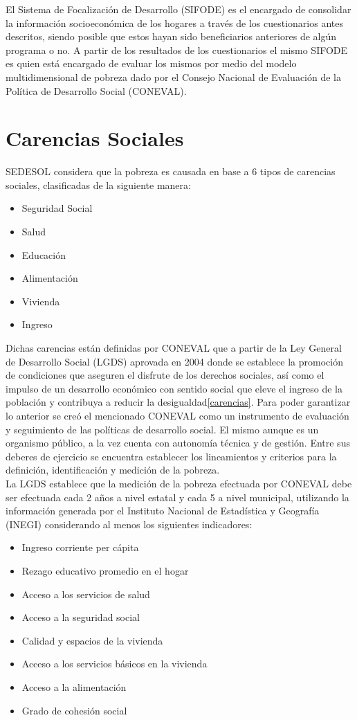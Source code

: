 El Sistema de Focalización de Desarrollo (SIFODE) es el encargado de consolidar la información socioeconómica de los hogares a través de los cuestionarios antes descritos, siendo posible que estos hayan sido beneficiarios anteriores de algún programa o no. A partir de los resultados de los cuestionarios el mismo SIFODE es quien está encargado de evaluar los mismos por medio del modelo multidimensional de pobreza dado por el Consejo Nacional de Evaluación de la Política de Desarrollo Social (CONEVAL)\cite{multidimensional}.\\

\section{Carencias Sociales}
SEDESOL considera que la pobreza es causada en base a 6 tipos de carencias sociales, clasificadas de la siguiente manera:\\
\begin{itemize}
    \item Seguridad Social
    \item Salud
    \item Educación
    \item Alimentación
    \item Vivienda
    \item Ingreso
\end{itemize}
Dichas carencias están definidas por CONEVAL\cite{coneval} que a partir de la Ley General de Desarrollo Social (LGDS) aprovada en 2004 donde se establece la promoción de condiciones que aseguren el disfrute de los derechos sociales, así como el impulso de un desarrollo económico con sentido social que eleve el ingreso de la población y contribuya a reducir la desigualdad\ref{carencias}. Para poder garantizar lo anterior se creó el mencionado CONEVAL como un instrumento de evaluación y seguimiento de las políticas de desarrollo social. El mismo aunque es un organismo público, a la vez cuenta con autonomía técnica y de gestión. Entre sus deberes de ejercicio se encuentra establecer los lineamientos y criterios para la definición, identificación y medición de la pobreza.\\
La LGDS establece que la medición de la pobreza efectuada por CONEVAL debe ser efectuada cada 2 años a nivel estatal y cada 5 a nivel municipal, utilizando la información generada por el Instituto Nacional de Estadística y Geografía (INEGI)\cite{inegi} considerando al menos los siguientes indicadores:
\begin{itemize}
    \item Ingreso corriente per cápita
    \item Rezago educativo promedio en el hogar
    \item Acceso a los servicios de salud
    \item Acceso a la seguridad social
    \item Calidad y espacios de la vivienda
    \item Acceso a los servicios básicos en la vivienda
    \item Acceso a la alimentación
    \item Grado de cohesión social
\end{itemize}

